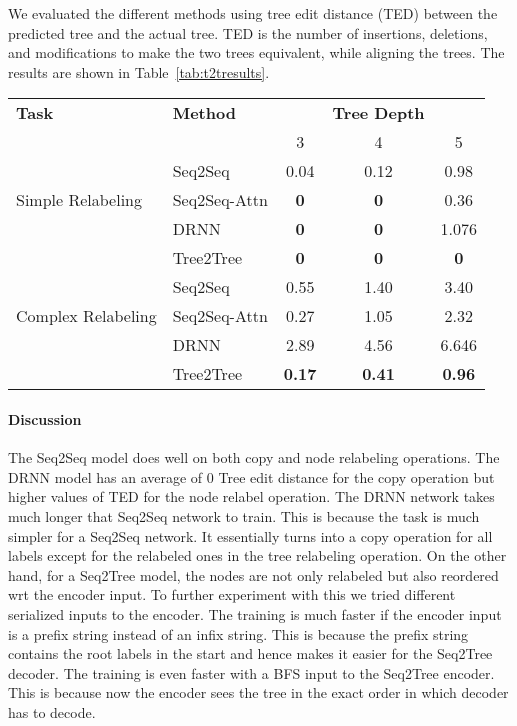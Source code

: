 \documentclass[11pt,a4paper]{article}
\begin{document}
We evaluated the different methods using tree edit distance (TED) \citep{tai1979tree,bille2005survey} between the predicted tree and the actual tree. TED is the number of insertions, deletions, and modifications to make the two trees equivalent, while aligning the trees.  
The results are shown in Table~\ref{tab:t2tresults}.
\begin{table*}[h!]
    \centering
    \begin{tabular}{l l|c c c }
         {\bf Task} & {\bf Method} &  & {\bf Tree Depth}  & \\ 
         & & 3 & 4 & 5  \\ \hline
         & Seq2Seq & 0.04& 0.12 & 0.98 \\
         Simple Relabeling & Seq2Seq-Attn & {\bf 0} & {\bf 0} & 0.36 \\
         & DRNN & {\bf 0} & {\bf 0} & 1.076 \\ 
         & Tree2Tree & {\bf 0} & {\bf 0} & {\bf 0} \\ \hline
         & Seq2Seq & 0.55 & 1.40 & 3.40 \\
         Complex Relabeling & Seq2Seq-Attn & 0.27 & 1.05 & 2.32 \\
          & DRNN & 2.89 & 4.56 & 6.646 \\  & Tree2Tree & {\bf 0.17} & {\bf 0.41} & {\bf 0.96} \\\hline
         
         
    \end{tabular}
    \caption{Tree edit distance for the tree tasks of tree copying (Copy),  node relabeling (Relabeling). The models are sequence-to-sequence
    (Seq2Seq), sequence-to-sequence with attention
    (Seq2Seq-Attn) and our DRNN Seq2Tree transducer method.}
    \label{tab:t2tresults}
\end{table*}
\paragraph{Discussion}
The Seq2Seq model does well on both copy and node relabeling operations. The DRNN model has an average of 0 Tree edit distance for the copy operation but higher values of TED for the node relabel operation.
The DRNN network takes much longer that Seq2Seq network to train. This is because the task is much simpler for a Seq2Seq network. It essentially turns into a copy operation for all labels except for the relabeled ones in the tree relabeling operation. On the other hand, for a Seq2Tree model, the nodes are not only relabeled but also reordered wrt the encoder input. To further experiment with this we tried different serialized inputs to the encoder. The training is much faster if the encoder input is a prefix string instead of an infix string. This is because the prefix string contains the root labels in the start and hence makes it easier for the Seq2Tree decoder. The training is even faster with a BFS input to the Seq2Tree encoder. This is because now the encoder sees the tree in the exact order in which decoder has to decode.
\end{document}
